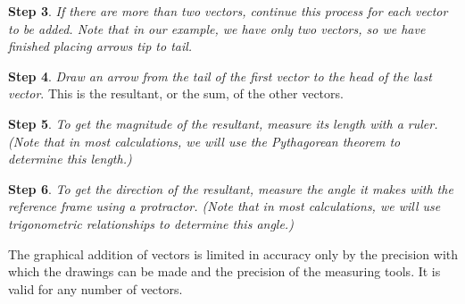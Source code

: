 \documentclass[../../main-ap-physics.tex]{subfiles}
\begin{document}
\textbf{Step 3}. \textit{If there are more than two vectors, continue this process for each vector to be added. Note that in our example, we have only two vectors, so we have finished placing arrows tip to tail.}

\vspace{1em}

\textbf{Step 4}. \textit{Draw an arrow from the tail of the first vector to the head of the last vector}. This is the resultant, or the sum, of the other vectors.

\begin{center}
\end{center}

\textbf{Step 5}. \textit{To get the magnitude of the resultant, measure its length with a ruler. (Note that in most calculations, we will use the Pythagorean theorem to determine this length.)}

\vspace{1em}

\textbf{Step 6}. \textit{To get the direction of the resultant, measure the angle it makes with the reference frame using a protractor. (Note that in most calculations, we will use trigonometric relationships to determine this angle.)}

\vspace{1em}

The graphical addition of vectors is limited in accuracy only by the precision with which the drawings can be made and the precision of the measuring tools. It is valid for any number of vectors.
\end{document}
